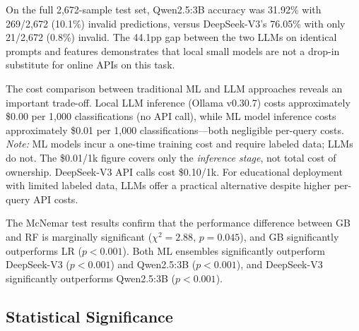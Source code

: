 \documentclass[acmsmall]{acmart}
\begin{document}
On the full 2,672-sample test set, Qwen2.5:3B accuracy was 31.92\% with
269/2,672 (10.1\%) invalid predictions, versus DeepSeek-V3's 76.05\% with
only 21/2,672 (0.8\%) invalid. The 44.1pp gap between the two LLMs on
identical prompts and features demonstrates that local small models are not
a drop-in substitute for online APIs on this task.

The cost comparison between traditional ML and LLM approaches reveals an
important trade-off. Local LLM inference (Ollama v0.30.7) costs approximately \$0.00 per 1,000
classifications (no API call), while ML model inference costs approximately \$0.01
per 1,000 classifications---both negligible per-query costs. \textit{Note:} ML
models incur a one-time training cost and require labeled data; LLMs do not.
The \$0.01/1k figure covers only the \emph{inference stage}, not total cost of ownership.
DeepSeek-V3 API calls cost \$0.10/1k. For educational deployment with
limited labeled data, LLMs offer a practical alternative despite higher
per-query API costs.

The McNemar test results confirm that the performance difference between
GB and RF is marginally significant ($\chi^2 = 2.88$, $p = 0.045$),
and GB significantly outperforms LR ($p < 0.001$). Both ML ensembles
significantly outperform DeepSeek-V3 ($p < 0.001$) and Qwen2.5:3B
($p < 0.001$), and DeepSeek-V3 significantly outperforms Qwen2.5:3B
($p < 0.001$).

\subsection{Statistical Significance}
\end{document}
